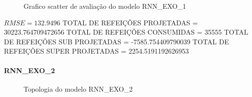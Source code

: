 \documentclass[	12pt, Times, openright, twoside, a4paper, english, brazil]{abntex2}
\begin{document}
                \begin{figure}[!ht]
                  \caption{Grafico scatter de avaliação do modelo RNN\_EXO\_1 \label{fig:case1_rnn_exo_1_val_scatter} }
                \end{figure}

                $RMSE = 132.9496$\newline
                TOTAL DE REFEIÇÕES PROJETADAS = 30223.764709472656\newline
                TOTAL DE REFEIÇÕES CONSUMIDAS = 35555\newline
                TOTAL DE REFEIÇÕES SUB PROJETADAS = -7585.754409790039\newline
                TOTAL DE REFEIÇÕES SUPER PROJETADAS = 2254.5191192626953\newline

              \paragraph{RNN\_EXO\_2}
                \begin{figure}[!ht]
                  \caption{Topologia do modelo RNN\_EXO\_2 \label{fig:case1_rnn_exo_2} }
                \end{figure}
\end{document}
